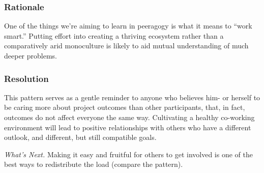 \subsubsection*{Rationale}  One of the things we're aiming to learn in
peeragogy is what it means to ``work smart.''  Putting effort into creating
a thriving ecosystem rather than a comparatively arid monoculture is likely to
aid mutual understanding of much deeper problems.

\subsubsection*{Resolution}
This pattern serves as a gentle reminder to anyone who believes him- or
herself to be caring more about project outcomes than other
participants, that, in fact, outcomes do not affect everyone the same way.
Cultivating a healthy co-working environment will lead to positive relationships
with others who have a different outlook, and different, but still compatible goals.

\begin{framed}
\emph{What's Next.}
Making it easy
and fruitful for others to get involved is one of the best ways to
redistribute the load (compare the
pattern).
\end{framed}
